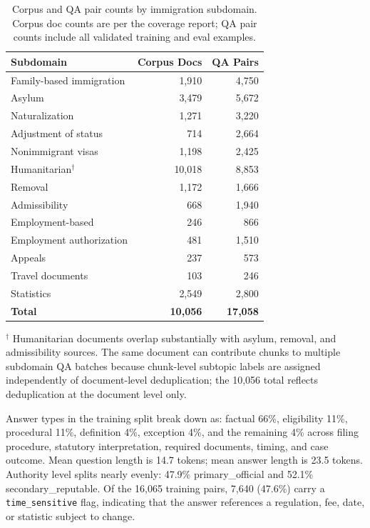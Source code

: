 \documentclass[11pt]{article}
\begin{document}
\begin{table}[ht]
  \centering
  \caption{Corpus and QA pair counts by immigration subdomain. Corpus doc counts are per the coverage report; QA pair counts include all validated training and eval examples.}
  \label{tab:corpus}
  \begin{tabular}{lrr}
    \toprule
    Subdomain & Corpus Docs & QA Pairs \\
    \midrule
    Family-based immigration & 1,910 & 4,750 \\
    Asylum & 3,479 & 5,672 \\
    Naturalization & 1,271 & 3,220 \\
    Adjustment of status & 714 & 2,664 \\
    Nonimmigrant visas & 1,198 & 2,425 \\
    Humanitarian$^\dagger$ & 10,018 & 8,853 \\
    Removal & 1,172 & 1,666 \\
    Admissibility & 668 & 1,940 \\
    Employment-based & 246 & 866 \\
    Employment authorization & 481 & 1,510 \\
    Appeals & 237 & 573 \\
    Travel documents & 103 & 246 \\
    Statistics & 2,549 & 2,800 \\
    \midrule
    \textbf{Total} & \textbf{10,056} & \textbf{17,058} \\
    \bottomrule
  \end{tabular}
  \begin{flushleft}
    \small $^\dagger$ Humanitarian documents overlap substantially with asylum, removal, and admissibility sources. The same document can contribute chunks to multiple subdomain QA batches because chunk-level subtopic labels are assigned independently of document-level deduplication; the 10,056 total reflects deduplication at the document level only.
  \end{flushleft}
\end{table}

Answer types in the training split break down as: factual 66\%, eligibility 11\%, procedural 11\%, definition 4\%, exception 4\%, and the remaining 4\% across filing procedure, statutory interpretation, required documents, timing, and case outcome. Mean question length is 14.7 tokens; mean answer length is 23.5 tokens. Authority level splits nearly evenly: 47.9\% primary\_official and 52.1\% secondary\_reputable. Of the 16,065 training pairs, 7,640 (47.6\%) carry a \texttt{time\_sensitive} flag, indicating that the answer references a regulation, fee, date, or statistic subject to change.
\end{document}
